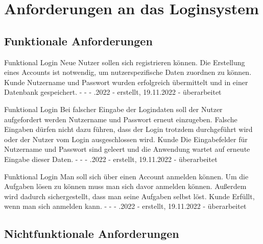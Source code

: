 \section*{Anforderungen an das Loginsystem}
\subsection*{Funktionale Anforderungen}
\begin{myreq}
  \threeinline
    {}
    {\reqtype Funktional}
    {\reqevent Login}
  \reqdesc Neue Nutzer sollen sich registrieren können.
  \reqrat Die Erstellung eines Accounts ist notwendig, um nutzerspezifische Daten zuordnen zu können. 
  \reqorig Kunde 
  \reqfit Nutzername und Passwort wurden erfolgreich übermittelt und in einer Datenbank gespeichert.
  \twoinline
    {}
    {}
  \twoinline
  {\reqdep -}
  {\reqconf -}
  \reqmater -
  .2022 - erstellt, 19.11.2022 - überarbeitet
\end{myreq}

\begin{myreq}
  \threeinline
    {}
    {\reqtype Funktional}
    {\reqevent Login}
  \reqdesc Bei falscher Eingabe der Logindaten soll der Nutzer aufgefordert werden Nutzername und Passwort erneut einzugeben.
  \reqrat Falsche Eingaben dürfen nicht dazu führen, dass der Login trotzdem durchgeführt wird oder der Nutzer vom Login ausgeschlossen wird.
  \reqorig Kunde
  \reqfit Die Eingabefelder für Nutzername und Passwort sind geleert und die Anwendung wartet auf erneute Eingabe dieser Daten.
  \twoinline
    {}
    {}
  \twoinline
  {\reqdep -}
  {\reqconf -}
  \reqmater -
  .2022 - erstellt, 19.11.2022 - überarbeitet
\end{myreq}

\begin{myreq}
  \threeinline
    {}
    {\reqtype Funktional}
    {\reqevent Login}
  \reqdesc Man soll sich über einen Account anmelden können.
  \reqrat Um die Aufgaben lösen zu können muss man sich davor anmelden können. Außerdem wird dadurch sichergestellt, dass man seine Aufgaben selbst löst.
  \reqorig Kunde 
  \reqfit Erfüllt, wenn man sich anmelden kann.
  \twoinline
    {}
    {}
  \twoinline
  {\reqdep -}
  {\reqconf -}
  \reqmater -
  .2022 - erstellt, 19.11.2022 - überarbeitet
\end{myreq}

\subsection*{Nichtfunktionale Anforderungen}

